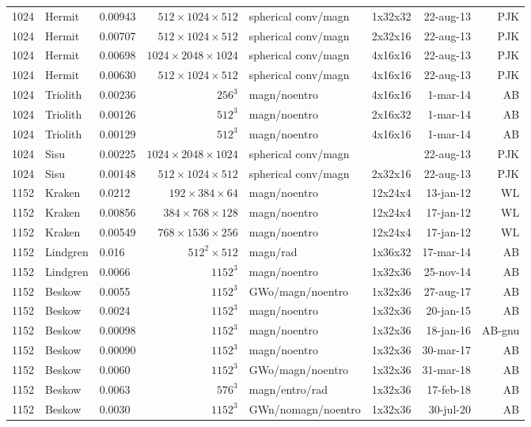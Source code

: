 \documentclass[\mydriver,12pt,twoside,notitlepage,a4paper]{article}
\begin{document}
\begin{center}
\begin{footnotesize}
\begin{longtable}{rllrlrrr}
1024&Hermit&0.00943&$512{\!\times\!}1024{\!\times\!}512$&spherical conv/magn&1x32x32&22-aug-13&PJK\\
1024&Hermit&0.00707&$512{\!\times\!}1024{\!\times\!}512$&spherical conv/magn&2x32x16&22-aug-13&PJK\\
1024&Hermit&0.00698&$1024{\!\times\!}2048{\!\times\!}1024$&spherical conv/magn&4x16x16&22-aug-13&PJK\\
1024&Hermit&0.00630&$512{\!\times\!}1024{\!\times\!}512$&spherical conv/magn&4x16x16&22-aug-13&PJK\\
1024 &Triolith&0.00236&$256^3$ & magn/noentro & 4x16x16&  1-mar-14 & AB \\
1024 &Triolith&0.00126&$512^3$ & magn/noentro & 2x16x32&  1-mar-14 & AB \\
1024 &Triolith&0.00129&$512^3$ & magn/noentro & 4x16x16&  1-mar-14 & AB \\
1024&Sisu&0.00225&$1024{\!\times\!}2048{\!\times\!}1024$&spherical conv/magn& &22-aug-13&PJK\\
1024&Sisu&0.00148&$512{\!\times\!}1024{\!\times\!}512$&spherical conv/magn&2x32x16&22-aug-13&PJK\\
1152&Kraken&0.0212&$192{\!\times\!}384{\!\times\!}64$&magn/noentro&12x24x4               &13-jan-12&WL\\
1152&Kraken& 0.00856  &$384{\!\times\!}768{\!\times\!}128$ & magn/noentro & 12x24x4 &17-jan-12 & WL\\
1152&Kraken& 0.00549  &$768{\!\times\!}1536{\!\times\!}256$ & magn/noentro & 12x24x4 &17-jan-12 & WL\\
1152&Lindgren&0.016&$512^2{\!\times\!}512$&magn/rad&1x36x32&17-mar-14& AB \\
1152&Lindgren&0.0066&$1152^3$&magn/noentro&1x32x36&25-nov-14& AB \\
1152&Beskow&0.0055&$1152^3$&GWo/magn/noentro&1x32x36&27-aug-17& AB \\
1152&Beskow&0.0024&$1152^3$&magn/noentro&1x32x36&20-jan-15& AB \\
1152&Beskow&0.00098&$1152^3$&magn/noentro&1x32x36&18-jan-16& AB-gnu \\
1152&Beskow&0.00090&$1152^3$&magn/noentro&1x32x36&30-mar-17& AB \\
1152&Beskow&0.0060 &$1152^3$&GWo/magn/noentro&1x32x36 &31-mar-18 & AB \\
1152&Beskow&0.0063 &$ 576^3$&magn/entro/rad&1x32x36 &17-feb-18 & AB \\
1152&Beskow&0.0030 &$1152^3$&GWn/nomagn/noentro&1x32x36 &30-jul-20 & AB \\

\end{longtable}
\end{footnotesize}
\end{center}
\end{document}
